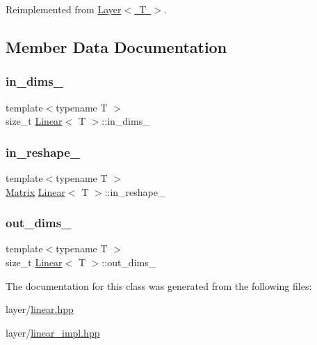 Reimplemented from \mbox{\hyperlink{class_layer_a43681206a2ef690667c41423b6b6f20b}{Layer$<$ T $>$}}.



\subsection{Member Data Documentation}
\mbox{\label{class_linear_ae15dad7b24bbc705da10f6896188ab13}} 
\subsubsection{\texorpdfstring{in\_dims\_}{in\_dims\_}}
{\footnotesize\ttfamily template$<$typename T $>$ \\
size\+\_\+t \mbox{\hyperlink{class_linear}{Linear}}$<$ T $>$\+::in\+\_\+dims\+\_\+\hspace{0.3cm}{\ttfamily [protected]}}

\mbox{\label{class_linear_a52fbc58c45b62d75089fc627c5210455}} 
\subsubsection{\texorpdfstring{in\_reshape\_}{in\_reshape\_}}
{\footnotesize\ttfamily template$<$typename T $>$ \\
\mbox{\hyperlink{class_layer_a22b1e7286096aa62bd245536c8ebdaf1}{Matrix}} \mbox{\hyperlink{class_linear}{Linear}}$<$ T $>$\+::in\+\_\+reshape\+\_\+\hspace{0.3cm}{\ttfamily [protected]}}

\mbox{\label{class_linear_affb0e56f0ca748a62e4aa5ce5733b491}} 
\subsubsection{\texorpdfstring{out\_dims\_}{out\_dims\_}}
{\footnotesize\ttfamily template$<$typename T $>$ \\
size\+\_\+t \mbox{\hyperlink{class_linear}{Linear}}$<$ T $>$\+::out\+\_\+dims\+\_\+\hspace{0.3cm}{\ttfamily [protected]}}



The documentation for this class was generated from the following files\+:\begin{DoxyCompactItemize}
\item 
layer/\mbox{\hyperlink{linear_8hpp}{linear.\+hpp}}\item 
layer/\mbox{\hyperlink{linear__impl_8hpp}{linear\+\_\+impl.\+hpp}}\end{DoxyCompactItemize}
